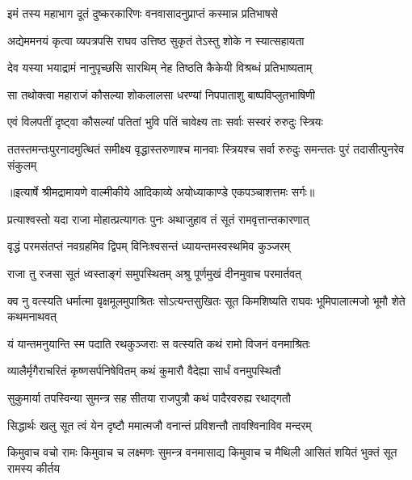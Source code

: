 \twolineshloka
{इमं तस्य महाभाग दूतं दुष्करकारिणः}
{वनवासादनुप्राप्तं कस्मान्न प्रतिभाषसे} %

\twolineshloka
{अद्येममनयं कृत्वा व्यपत्रपसि राघव}
{उत्तिष्ठ सुकृतं तेऽस्तु शोके न स्यात्सहायता} %

\twolineshloka
{देव यस्या भयाद्रामं नानुपृच्छसि सारथिम्}
{नेह तिष्ठति कैकेयी विश्रब्धं प्रतिभाष्यताम्} %

\twolineshloka
{सा तथोक्त्वा महाराजं कौसल्या शोकलालसा}
{धरण्यां निपपाताशु बाष्पविप्लुतभाषिणी} %

\twolineshloka
{एवं विलपतीं दृष्ट्वा कौसल्यां पतितां भुवि}
{पतिं चावेक्ष्य ताः सर्वाः सस्वरं रुरुदुः स्त्रियः} %

\fourlineindentedshloka
{ततस्तमन्तःपुरनादमुत्थितं}
{ समीक्ष्य वृद्धास्तरुणाश्च मानवाः}
{स्त्रियश्च सर्वा रुरुदुः समन्ततः}
{ पुरं तदासीत्पुनरेव संकुलम्} %


{॥इत्यार्षे श्रीमद्रामायणे वाल्मीकीये आदिकाव्ये अयोध्याकाण्डे एकपञ्चाशत्तमः सर्गः॥}


\twolineshloka
{प्रत्याश्वस्तो यदा राजा मोहात्प्रत्यागतः पुनः}
{अथाजुहाव तं सूतं रामवृत्तान्तकारणात्} %

\twolineshloka
{वृद्धं परमसंतप्तं नवग्रहमिव द्विपम्}
{विनिःश्वसन्तं ध्यायन्तमस्वस्थमिव कुञ्जरम्} %

\twolineshloka
{राजा तु रजसा सूतं ध्वस्ताङ्गं समुपस्थितम्}
{अश्रु पूर्णमुखं दीनमुवाच परमार्तवत्} %

\threelineshloka
{क्व नु वत्स्यति धर्मात्मा वृक्षमूलमुपाश्रितः}
{सोऽत्यन्तसुखितः सूत किमशिष्यति राघवः}
{भूमिपालात्मजो भूमौ शेते कथमनाथवत्} %

\twolineshloka
{यं यान्तमनुयान्ति स्म पदाति रथकुञ्जराः}
{स वत्स्यति कथं रामो विजनं वनमाश्रितः} %

\twolineshloka
{व्यालैर्मृगैराचरितं कृष्णसर्पनिषेवितम्}
{कथं कुमारौ वैदेह्या सार्धं वनमुपस्थितौ} %

\twolineshloka
{सुकुमार्या तपस्विन्या सुमन्त्र सह सीतया}
{राजपुत्रौ कथं पादैरवरुह्य रथाद्गतौ} %

\twolineshloka
{सिद्धार्थः खलु सूत त्वं येन दृष्टौ ममात्मजौ}
{वनान्तं प्रविशन्तौ तावश्विनाविव मन्दरम्} %

\threelineshloka
{किमुवाच वचो रामः किमुवाच च लक्ष्मणः}
{सुमन्त्र वनमासाद्य किमुवाच च मैथिली}
{आसितं शयितं भुक्तं सूत रामस्य कीर्तय} %

